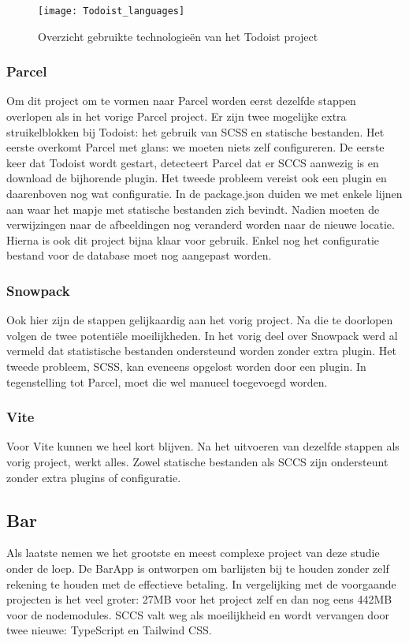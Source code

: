 \begin{figure}[h]
   \texttt{[image: Todoist\_languages]}
       \centering
       \caption{Overzicht gebruikte technologieën van het Todoist project}
   \end{figure}

\subsubsection{Parcel}

Om dit project om te vormen naar Parcel worden eerst dezelfde stappen overlopen als in het vorige Parcel project. Er zijn twee mogelijke extra struikelblokken bij Todoist: het gebruik van SCSS en statische bestanden. Het eerste overkomt Parcel met glans: we moeten niets zelf configureren. De eerste keer dat Todoist wordt gestart, detecteert Parcel dat er SCCS aanwezig is en download de bijhorende plugin. Het tweede probleem vereist ook een plugin en daarenboven nog wat configuratie. In de package.json duiden we met enkele lijnen aan waar het mapje met statische bestanden zich bevindt. Nadien moeten de verwijzingen naar de afbeeldingen nog veranderd worden naar de nieuwe locatie. Hierna is ook dit project bijna klaar voor gebruik. Enkel nog het configuratie bestand voor de database moet nog aangepast worden.

\subsubsection{Snowpack}

Ook hier zijn de stappen gelijkaardig aan het vorig project. Na die te doorlopen volgen de twee potentiële moeilijkheden. In het vorig deel over Snowpack werd al vermeld dat statistische bestanden ondersteund worden zonder extra plugin. Het tweede probleem, SCSS, kan eveneens opgelost worden door een plugin. In tegenstelling tot Parcel, moet die wel manueel toegevoegd worden.

\subsubsection{Vite}

Voor Vite kunnen we heel kort blijven. Na het uitvoeren van dezelfde stappen als vorig project, werkt alles. Zowel statische bestanden als SCCS zijn ondersteunt zonder extra plugins of configuratie.

\subsection{Bar}
Als laatste nemen we het grootste en meest complexe project van deze studie onder de loep. De BarApp \autocite{vansteenkiste-2021} is ontworpen om barlijsten bij te houden zonder zelf rekening te houden met de effectieve betaling. In vergelijking met de voorgaande projecten is het veel groter: 27MB voor het project zelf en dan nog eens 442MB voor de nodemodules. SCCS valt weg als moeilijkheid en wordt vervangen door twee nieuwe: TypeScript en Tailwind CSS.


